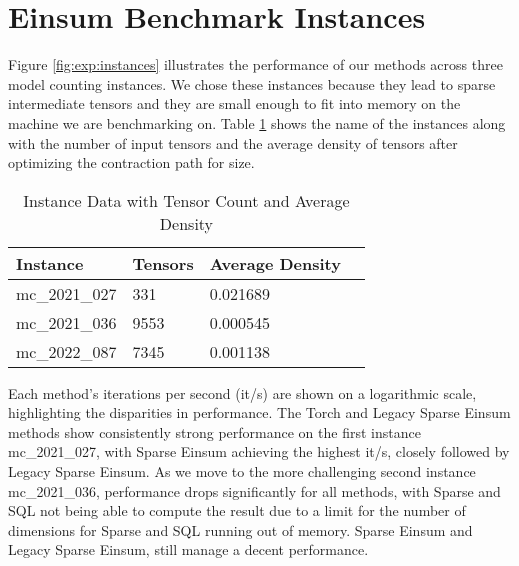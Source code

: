 \section{Einsum Benchmark Instances}
Figure \ref{fig:exp:instances} illustrates the performance of our methods across three model
counting instances. We chose these instances because they lead to sparse intermediate tensors
and they are small enough to fit into memory on the machine we are benchmarking on. Table
\ref{tab:instance:data} shows the name of the instances along with the number of input tensors
and the average density of tensors after optimizing the contraction path for size.
\begin{table}[hbp]
    \caption{Instance Data with Tensor Count and Average Density}
    \label{tab:instance:data}
    \centering
    \begin{tabularx}{0.8\textwidth}{lXlX}
        \toprule
        \textbf{Instance} & \textbf{Tensors} & \textbf{Average Density} \\
        \midrule
        mc\_2021\_027     & 331              & 0.021689                 \\
        mc\_2021\_036     & 9553             & 0.000545                 \\
        mc\_2022\_087     & 7345             & 0.001138                 \\
        \bottomrule
    \end{tabularx}
\end{table}
Each method's iterations per second (it/s) are shown on a logarithmic scale,
highlighting the disparities in performance. The Torch and Legacy Sparse Einsum methods show
consistently strong performance on the first instance mc\_2021\_027, with Sparse Einsum achieving
the highest it/s, closely followed by Legacy Sparse Einsum. As we move to the more challenging second
instance mc\_2021\_036, performance drops significantly for all methods, with Sparse and SQL not being
able to compute the result due to a limit for the number of dimensions for Sparse and SQL running out
of memory. Sparse Einsum and Legacy Sparse Einsum, still manage a decent performance.

